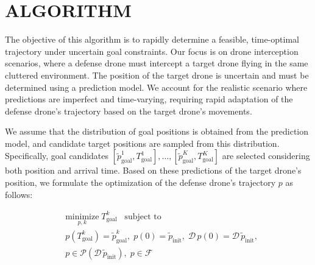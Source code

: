 \section{ALGORITHM}

The objective of this algorithm is to rapidly determine a feasible, time-optimal trajectory under uncertain goal constraints. 
Our focus is on drone interception scenarios, where a defense drone must intercept a target drone flying in the same cluttered environment. 
The position of the target drone is uncertain and must be determined using a prediction model. 
We account for the realistic scenario where predictions are imperfect and time-varying, requiring rapid adaptation of the defense drone's trajectory based on the target drone’s movements.

We assume that the distribution of goal positions is obtained from the prediction model, and candidate target positions are sampled from this distribution. 
Specifically, goal candidates $[\tilde p_{\text{goal}}^1, T_{\text{goal}}^1], \dots, [\tilde p_{\text{goal}}^K, T_{\text{goal}}^K]$ are selected considering both position and arrival time.
Based on these predictions of the target drone's position, we formulate the optimization of the defense drone's trajectory $p$ as follows:

\begin{equation}
\begin{aligned}
&\underset{p, k}{\text{minimize}} \; T_{\text{goal}}^k \;\;\; \text{subject to}\\
&p(T_{\text{goal}}^k) = \tilde p_{\text{goal}}^k, \; p(0) = \tilde p_{\text{init}},\; \mathcal{D\,} p(0) = \mathcal{D\,} \tilde p_{\text{init}}, \\
&p \in \mathcal{P}(\mathcal{D\,} \tilde p_{\text{init}}),\; p \in \mathcal{F}
\label{eqn:planning_homotopy}
\end{aligned}
\end{equation}



